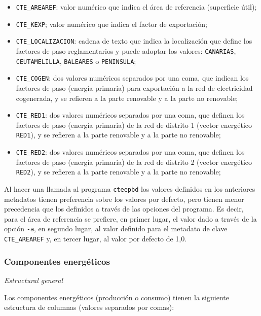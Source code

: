 \documentclass[10pt,notitlepage,oneside,a4paper]{article}
\begin{document}
\begin{itemize}
\item \texttt{CTE\_AREAREF}: valor numérico que indica el área de referencia (superficie útil);
\item \texttt{CTE\_KEXP}; valor numérico que indica el factor de exportación;
\item \texttt{CTE\_LOCALIZACION}: cadena de texto que indica la localización que define los factores de paso reglamentarios y puede adoptar los valores: \texttt{CANARIAS}, \texttt{CEUTAMELILLA}, \texttt{BALEARES} o \texttt{PENINSULA};
\item \texttt{CTE\_COGEN}: dos valores numéricos separados por una coma, que indican los factores de paso (energía primaria) para exportación a la red de electricidad cogenerada, y se refieren a la parte renovable y a la parte no renovable;
\item \texttt{CTE\_RED1}: dos valores numéricos separados por una coma, que definen los factores de paso (energía primaria) de la red de distrito 1 (vector energético \texttt{RED1}), y se refieren a la parte renovable y a la parte no renovable;
\item \texttt{CTE\_RED2}: dos valores numéricos separados por una coma, que definen los factores de paso (energía primaria) de la red de distrito 2 (vector energético \texttt{RED2}), y se refieren a la parte renovable y a la parte no renovable;
\end{itemize}

Al hacer una llamada al programa \texttt{cteepbd} los valores definidos en los anteriores metadatos tienen preferencia sobre los valores por defecto, pero tienen menor precedencia que los definidos a través de las opciones del programa. Es decir, para el área de referencia se prefiere, en primer lugar, el valor dado a través de la opción \texttt{-a}, en segundo lugar, al valor definido para el metadato de clave \texttt{CTE\_AREAREF} y, en tercer lugar, al valor por defecto de 1,0.

\subsubsection{Componentes energéticos}\label{sec:componentesenergeticos}

\textit{Estructural general}

Los componentes energéticos (producción o consumo) tienen la siguiente estructura de columnas (valores separados por comas):
\end{document}
